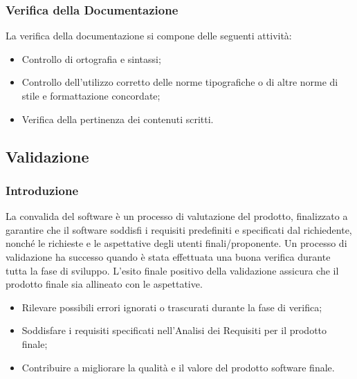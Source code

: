 \subsubsection*{Verifica della Documentazione}
La verifica della documentazione si compone delle seguenti attività:
\begin{itemize}
    \item Controllo di ortografia e sintassi;
    \item Controllo dell’utilizzo corretto delle norme tipografiche o di altre norme di stile e formattazione concordate;
    \item Verifica della pertinenza dei contenuti scritti.
\end{itemize}








\subsection{Validazione}
\subsubsection{Introduzione}
La convalida del software è un processo di valutazione del prodotto, finalizzato a garantire che il 
software soddisfi i requisiti predefiniti e specificati dal richiedente, nonché le richieste e le aspettative 
degli utenti finali/proponente. Un processo di validazione ha successo quando è stata effettuata una buona 
verifica durante tutta la fase di sviluppo.
L’esito finale positivo della validazione assicura che il prodotto finale sia allineato con le aspettative.
\begin{itemize}
    \item Rilevare possibili errori ignorati o trascurati durante la fase di verifica;
    \item Soddisfare i requisiti specificati nell’Analisi dei Requisiti per il prodotto finale;
    \item Contribuire a migliorare la qualità e il valore del prodotto software finale.
\end{itemize}